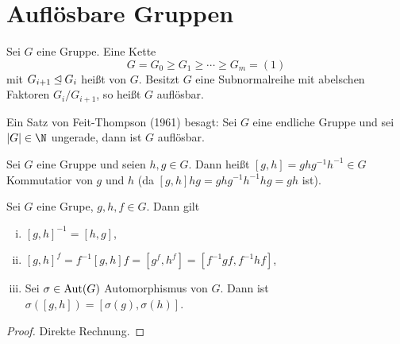 
\section{Auflösbare Gruppen}

\begin{df} \label{20.3-1}
	Sei $G$ eine Gruppe.
	Eine Kette
	\[
		G = G_0 \ge G_1 \ge \dotsb \ge G_m = (1)
	\]
	mit $G_{i+1} \mathbin{\trianglelefteq} G_i$ heißt  von $G$.
	Besitzt $G$ eine Subnormalreihe mit abelschen Faktoren $G_i / G_{i+1}$, so heißt $G$ auflösbar.
\end{df}

Ein Satz von Feit-Thompson (1961) besagt:
Sei $G$ eine endliche Gruppe und sei $|G| \in \N$ ungerade, dann ist $G$ auflösbar.

\begin{df} \label{20.3-2}
	Sei $G$ eine Gruppe und seien $h,g \in G$.
	Dann heißt $[g, h] = ghg^{-1}h^{-1} \in G$ Kommutatior von $g$ und $h$ (da $[g,h]hg = ghg^{-1}h^{-1}hg = gh$ ist).
\end{df}

\begin{lem} \label{20.3-3}
	Sei $G$ eine Grupe, $g, h, f \in G$.
	Dann gilt
	\begin{enumerate}[i)]
		\item
			$[g, h]^{-1} = [h, g]$,
		\item
			$[g, h]^f = f^{-1} [g,h] f = [g^f, h^f] = [f^{-1}g f, f^{-1} h f]$,
		\item
			Sei $\sigma \in \operatorname{Aut}(G)$ Automorphismus von $G$.
			Dann ist $\sigma([g,h]) = [\sigma(g), \sigma(h)]$.
	\end{enumerate}
	\begin{proof}
		Direkte Rechnung.
	\end{proof}
\end{lem}

